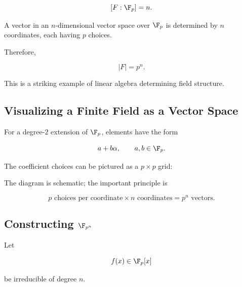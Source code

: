 \[ [F:\F_p]=n. \]

A vector in an \(n\)-dimensional vector space over \(\F_p\) is determined by
\(n\) coordinates, each having \(p\) choices.

Therefore,

\[ |F|=p^n. \]

This is a striking example of linear algebra determining field structure.

\subsection{Visualizing a Finite Field as a Vector Space}
\label{subsec:finite-field-vector-space}

For a degree-\(2\) extension of \(\F_p\), elements have the form

\[ a+b\alpha,\qquad a,b\in\F_p. \]

The coefficient choices can be pictured as a \(p\times p\) grid:

\begin{center}
\end{center}

The diagram is schematic; the important principle is

\[ p\text{ choices per coordinate}\times n\text{ coordinates}=p^n\text{ vectors}. \]

\subsection{Constructing \(\F_{p^n}\)}
\label{subsec:constructing-finite-fields}

Let

\[ f(x)\in\F_p[x] \]

be irreducible of degree \(n\).

